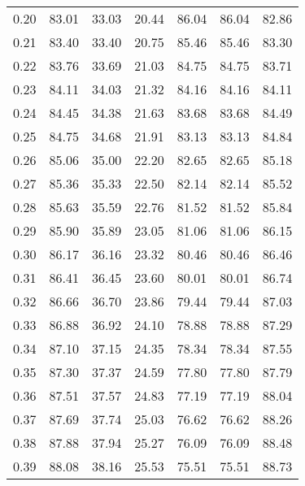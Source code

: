 \begin{tabular}{|c|c|c|c|c|c|c|}
      0.20 &     83.01 &     33.03 &      20.44 &   86.04 &      86.04 &         82.86 \\
      0.21 &     83.40 &     33.40 &      20.75 &   85.46 &      85.46 &         83.30 \\
      0.22 &     83.76 &     33.69 &      21.03 &   84.75 &      84.75 &         83.71 \\
      0.23 &     84.11 &     34.03 &      21.32 &   84.16 &      84.16 &         84.11 \\
      0.24 &     84.45 &     34.38 &      21.63 &   83.68 &      83.68 &         84.49 \\
      0.25 &     84.75 &     34.68 &      21.91 &   83.13 &      83.13 &         84.84 \\
      0.26 &     85.06 &     35.00 &      22.20 &   82.65 &      82.65 &         85.18 \\
      0.27 &     85.36 &     35.33 &      22.50 &   82.14 &      82.14 &         85.52 \\
      0.28 &     85.63 &     35.59 &      22.76 &   81.52 &      81.52 &         85.84 \\
      0.29 &     85.90 &     35.89 &      23.05 &   81.06 &      81.06 &         86.15 \\
      0.30 &     86.17 &     36.16 &      23.32 &   80.46 &      80.46 &         86.46 \\
      0.31 &     86.41 &     36.45 &      23.60 &   80.01 &      80.01 &         86.74 \\
      0.32 &     86.66 &     36.70 &      23.86 &   79.44 &      79.44 &         87.03 \\
      0.33 &     86.88 &     36.92 &      24.10 &   78.88 &      78.88 &         87.29 \\
      0.34 &     87.10 &     37.15 &      24.35 &   78.34 &      78.34 &         87.55 \\
      0.35 &     87.30 &     37.37 &      24.59 &   77.80 &      77.80 &         87.79 \\
      0.36 &     87.51 &     37.57 &      24.83 &   77.19 &      77.19 &         88.04 \\
      0.37 &     87.69 &     37.74 &      25.03 &   76.62 &      76.62 &         88.26 \\
      0.38 &     87.88 &     37.94 &      25.27 &   76.09 &      76.09 &         88.48 \\
      0.39 &     88.08 &     38.16 &      25.53 &   75.51 &      75.51 &         88.73 \\

\end{tabular}
